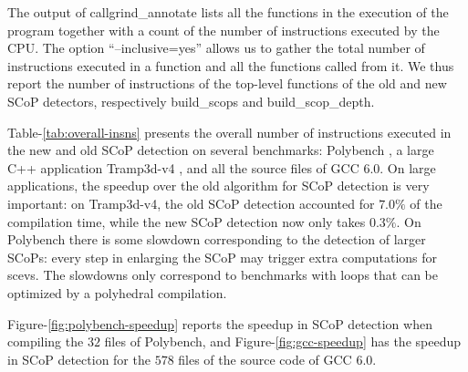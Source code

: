 \documentclass{sig-alternate}
\begin{document}
The output of callgrind\_annotate lists all the functions in the execution of
the program together with a count of the number of instructions executed by the
CPU.  The option ``--inclusive=yes'' allows us to gather the total number of
instructions executed in a function and all the functions called from it.  We
thus report the number of instructions of the top-level functions of the old and
new SCoP detectors, respectively build\_scops and build\_scop\_depth.

Table-\ref{tab:overall-insns} presents the overall number of instructions
executed in the new and old SCoP detection on several benchmarks: Polybench
\cite{polybench}, a large C++ application Tramp3d-v4 \cite{richi}, and all the
source files of GCC 6.0.  On large applications, the speedup over the old
algorithm for SCoP detection is very important: on Tramp3d-v4, the old SCoP
detection accounted for $7.0\%$ of the compilation time, while the new SCoP
detection now only takes $0.3\%$.  On Polybench there is some slowdown
corresponding to the detection of larger SCoPs: every step in enlarging the SCoP
may trigger extra computations for scevs.  The slowdowns only correspond to
benchmarks with loops that can be optimized by a polyhedral compilation.

Figure-\ref{fig:polybench-speedup} reports the speedup in SCoP detection when
compiling the $32$ files of Polybench, and Figure-\ref{fig:gcc-speedup} has the
speedup in SCoP detection for the $578$ files of the source code of GCC 6.0.

\begin{table}[h!]
  \begin{center}
  \end{center}
  \caption{Overall number of instructions spent in SCoP detection: columns New
    and Old report the number of instructions executed by the old and new SCoP
    detectors of GCC; Speedup reports the speedup between Old and New; Main
    reports the cumulative number of instructions executed by the main function
    of the GCC cc1plus compiler; Old \% and New \% report the overall
    compilation time overhead of the old and new SCoP detection.}
  \label{tab:overall-insns}
\end{table}
\end{document}
